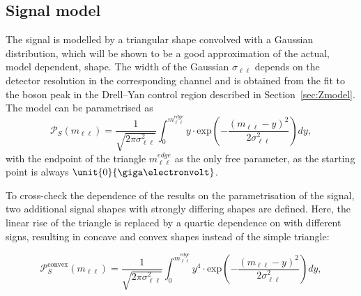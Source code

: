 \subsection{Signal model}
\label{sec:sigModel}
The signal is modelled by a triangular shape convolved with a Gaussian distribution, which will be shown to be a good approximation of the actual, model dependent, shape. The width of the Gaussian $\sigma_{\ell\ell}$ depends on the detector resolution in the corresponding channel and is obtained from the fit to the \Z boson peak in the Drell--Yan control region described in Section~\ref{sec:Zmodel}. The model can be parametrised as
\begin{equation*}
 {\mathcal{P}}_{S}(m_{\ell\ell}) = \frac{1}{\sqrt{2\pi\sigma_{\ell\ell}^2}} \int_{0}^{m_{\ell\ell}^{edge}} y \cdot \textrm{exp}\left( -\frac{(m_{\ell\ell}-y)^2}{2\sigma_{\ell\ell}^{2}}\right) dy,
\end{equation*}
with the endpoint of the triangle $m_{\ell\ell}^{edge}$ as the only free parameter, as the starting point is always $\unit{0}{\giga\electronvolt}$.

To cross-check the dependence of the results on the parametrisation of the signal, two additional signal shapes with strongly differing shapes are defined. Here, the linear rise of the triangle is replaced by a quartic dependence on \mll with different signs, resulting in concave and convex shapes instead of the simple triangle:

\begin{equation}
\label{eq:convex}
 {\mathcal{P}}^{\text{convex}}_{S}(m_{\ell\ell}) = \frac{1}{\sqrt{2\pi\sigma_{\ell\ell}^2}} \int_{0}^{m_{\ell\ell}^{edge}} y^4 \cdot \textrm{exp}\left( -\frac{(m_{\ell\ell}-y)^2}{2\sigma_{\ell\ell}^{2}}\right) dy,
\end{equation}

